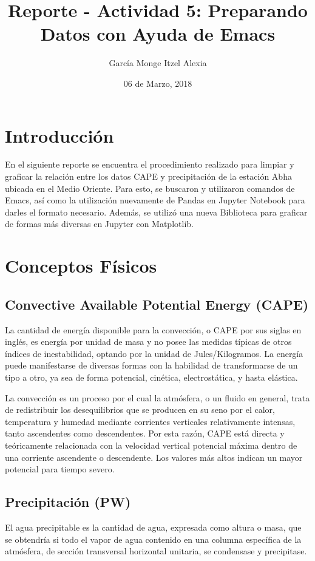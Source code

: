 \documentclass{article}
\title{Reporte - Actividad 5: Preparando Datos con Ayuda de Emacs}
\author{García Monge Itzel Alexia}
\date{06 de Marzo, 2018}
\begin{document}
\maketitle
\section{Introducción}
En el siguiente reporte se encuentra el procedimiento realizado para limpiar y graficar la relación entre los datos CAPE y precipitación de la estación Abha ubicada en el Medio Oriente. Para esto, se buscaron y utilizaron comandos de Emacs, así como la utilización nuevamente de Pandas en Jupyter Notebook para darles el formato necesario. Además, se utilizó una nueva Biblioteca para graficar de formas más diversas en Jupyter con Matplotlib.

\section{Conceptos Físicos}
\subsection{Convective Available Potential Energy (CAPE)}
La  cantidad de energía disponible para la convección, o CAPE por sus siglas en inglés, es energía por unidad de masa y no posee las medidas típicas de otros índices de inestabilidad, optando por la unidad de Jules/Kilogramos. La energía puede manifestarse de diversas formas con la habilidad de transformarse de un tipo a otro, ya sea de forma potencial, cinética, electrostática, y hasta elástica. 
 
La convección es un proceso por el cual la atmósfera, o un fluido en general, trata de redistribuir los desequilibrios que se producen en su seno por el calor, temperatura y humedad mediante corrientes verticales relativamente intensas, tanto ascendentes como descendentes. Por esta razón, CAPE está directa y teóricamente relacionada con la velocidad vertical potencial máxima dentro de una corriente ascendente o descendente. Los valores más altos indican un mayor potencial para tiempo severo.

\subsection{Precipitación (PW)}
El agua precipitable es la cantidad de agua, expresada como altura o masa, que se obtendría si todo el vapor de agua contenido en una columna específica de la atmósfera, de sección transversal horizontal unitaria, se condensase y precipitase.
\end{document}
